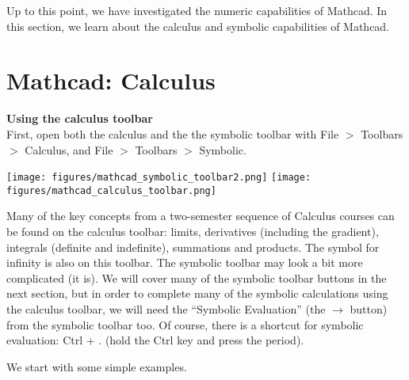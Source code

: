 Up to this point, we have investigated the numeric capabilities of Mathcad.  In this section, we learn about the calculus and symbolic capabilities of Mathcad.  


\section{Mathcad: Calculus}\label{sec:Mathcad_calculus}

\noindent \large \textsf{\textbf{Using the calculus toolbar }} \normalsize\\

First, open both the calculus and the the symbolic toolbar with File $>$ Toolbars $>$ Calculus, and File $>$ Toolbars $>$ Symbolic.

\begin{center}
\texttt{[image: figures/mathcad\_symbolic\_toolbar2.png]}
\texttt{[image: figures/mathcad\_calculus\_toolbar.png]}
\end{center}

Many of the key concepts from a two-semester sequence of Calculus courses can be found on the calculus toolbar: limits, derivatives (including the gradient), integrals (definite and indefinite), summations and products.  The symbol for infinity is also on this toolbar.
The symbolic toolbar may look a bit more complicated (it is). We will cover many of the symbolic toolbar buttons in the next section, but in order to complete many of the symbolic calculations using the calculus toolbar, we will need the ``Symbolic Evaluation'' (the $\longrightarrow$ button) from the symbolic toolbar too.  Of course, there is a shortcut for symbolic evaluation: Ctrl + . (hold the Ctrl key and press the period).

We start with some simple examples.\\


